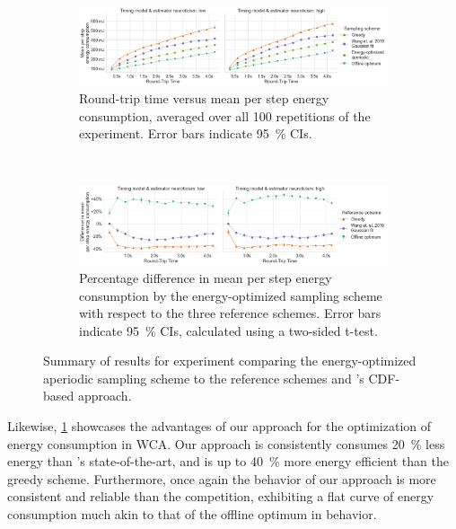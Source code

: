 \begin{figure}
    \centering
    \begin{subfigure}[t]{\textwidth}
        \centering
        \includegraphics[width=\textwidth]{figs/new_model/energy_optimization.png}
        \caption{%
            Round-trip time versus mean per step energy consumption, averaged over all \num{100} repetitions of the experiment.
            Error bars indicate \SI{95}{\percent} \glspl{CI}.
        }
    \end{subfigure}\\
    \medskip
    \begin{subfigure}[t]{\textwidth}
        \centering
        \includegraphics[width=\textwidth]{figs/new_model/energy_optimization_diff.png}
        \caption{%
            Percentage difference in mean per step energy consumption by the energy-optimized sampling scheme with respect to the three reference schemes.
            Error bars indicate \SI{95}{\percent} \glspl{CI}, calculated using a two-sided t-test.
        }
    \end{subfigure}
    \caption{%
        Summary of results for experiment comparing the energy-optimized aperiodic sampling scheme to the reference schemes and \textcite{wang2019towards}'s \gls{CDF}-based approach.
    }\label{fig:optimization:energy}
\end{figure}

Likewise, \cref{fig:optimization:energy} showcases the advantages of our approach for the optimization of energy consumption in \gls{WCA}.
Our approach is consistently consumes \SI{20}{\percent} less energy than \textcite{wang2019towards}'s state-of-the-art, and is up to \SI{40}{\percent} more energy efficient than the greedy scheme.
Furthermore, once again the behavior of our approach is more consistent and reliable than the competition, exhibiting a flat curve of energy consumption much akin to that of the offline optimum in behavior.
